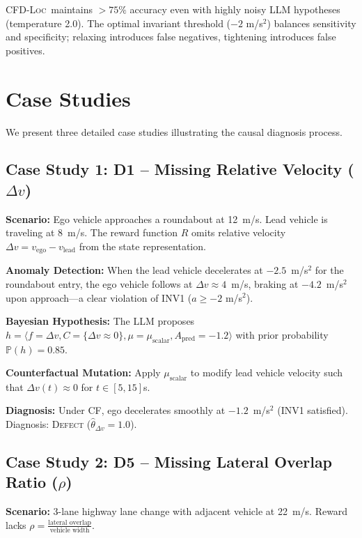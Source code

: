 \documentclass[journal]{IEEEtran}
\theoremstyle{plain}
\theoremstyle{definition}
\theoremstyle{remark}
\newcommand{\methodname}{\textsc{CFD-Loc}}
\newcommand{\Prob}{\mathbb{P}}
\begin{document}
\noindent \methodname\ maintains $>75\%$ accuracy even with highly noisy LLM hypotheses (temperature 2.0). The optimal invariant threshold ($-2$ m/s$^2$) balances sensitivity and specificity; relaxing introduces false negatives, tightening introduces false positives.

\section{Case Studies}
\label{sec:cases}

We present three detailed case studies illustrating the causal diagnosis process.

\subsection{Case Study 1: D1 -- Missing Relative Velocity ($\Delta v$)}

\textbf{Scenario:} Ego vehicle approaches a roundabout at 12~m/s. Lead vehicle is traveling at 8~m/s. The reward function $R$ omits relative velocity $\Delta v = v_{\text{ego}} - v_{\text{lead}}$ from the state representation.

\textbf{Anomaly Detection:} When the lead vehicle decelerates at $-2.5$~m/s$^2$ for the roundabout entry, the ego vehicle follows at $\Delta v \approx 4$~m/s, braking at $-4.2$~m/s$^2$ upon approach---a clear violation of INV1 ($a \geq -2$ m/s$^2$).

\textbf{Bayesian Hypothesis:} The LLM proposes $h = \langle f=\Delta v, C=\{\Delta v \approx 0\}, \mu=\mu_{\text{scalar}}, A_{\text{pred}} = -1.2 \rangle$ with prior probability $\Prob(h) = 0.85$.

\textbf{Counterfactual Mutation:} Apply $\mu_{\text{scalar}}$ to modify lead vehicle velocity such that $\Delta v(t) \approx 0$ for $t \in [5,15]$s.

\textbf{Diagnosis:} Under CF, ego decelerates smoothly at $-1.2$~m/s$^2$ (INV1 satisfied). Diagnosis: \textsc{Defect} ($\hat{\theta}_{\Delta v} = 1.0$).

\subsection{Case Study 2: D5 -- Missing Lateral Overlap Ratio ($\rho$)}

\textbf{Scenario:} 3-lane highway lane change with adjacent vehicle at 22~m/s. Reward lacks $\rho = \frac{\text{lateral overlap}}{\text{vehicle width}}$.
\end{document}
